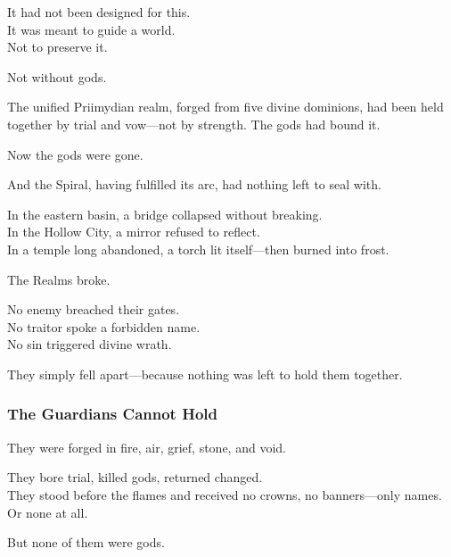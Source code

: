 \documentclass[12pt]{article}
\begin{document}
\vspace{0.5em}
It had not been designed for this.\\
It was meant to guide a world.\\
Not to preserve it.

\vspace{0.5em}
Not without gods.

\vspace{0.5em}
The unified Priimydian realm, forged from five divine dominions, had been held together by trial and vow---not by strength. The gods had bound it.

\vspace{0.5em}
Now the gods were gone.

\vspace{0.5em}
And the Spiral, having fulfilled its arc, had nothing left to seal with.

\vspace{0.5em}
In the eastern basin, a bridge collapsed without breaking.\\
In the Hollow City, a mirror refused to reflect.\\
In a temple long abandoned, a torch lit itself---then burned into frost.

\vspace{0.5em}
The Realms broke.

\vspace{0.5em}
No enemy breached their gates.\\
No traitor spoke a forbidden name.\\
No sin triggered divine wrath.

\vspace{0.5em}
They simply fell apart---because nothing was left to hold them together.

\dotfill

\subsubsection*{The Guardians Cannot Hold}

They were forged in fire, air, grief, stone, and void.

\vspace{0.5em}
They bore trial, killed gods, returned changed.\\
They stood before the flames and received no crowns, no banners---only names.\\
Or none at all.

\vspace{0.5em}
But none of them were gods.
\end{document}
